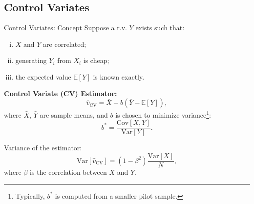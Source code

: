 \documentclass[9pt]{beamer}
\begin{document}


\subsection{Control Variates}

\begin{frame}{Control Variates: Concept}
\small
Suppose a r.v. $Y$ exists such that:
\begin{enumerate}[i.]
    \item $X$ and $Y$ are correlated;
    \item generating $Y_i$ from $X_i$ is cheap;
    \item the expected value $\mathbb{E}[Y]$ is known exactly.
\end{enumerate}

\textbf{Control Variate (CV) Estimator:}
\[
\hat{v}_{\text{CV}} = \bar{X} - b (\bar{Y} - \mathbb{E}[Y]),
\]
where $\bar{X}$, $\bar{Y}$ are sample means, and $b$ is chosen to minimize variance\footnote{Typically, $b^*$ is computed from a smaller pilot sample.}:
\[
b^* = \frac{\text{Cov}[X,Y]}{\text{Var}[Y]}.
\]

Variance of the estimator:
\[
\text{Var}[\hat{v}_{\text{CV}}] = (1-\beta^2) \frac{\text{Var}[X]}{N},
\]
where $\beta$ is the correlation between $X$ and $Y$.
\end{frame}
\end{document}
